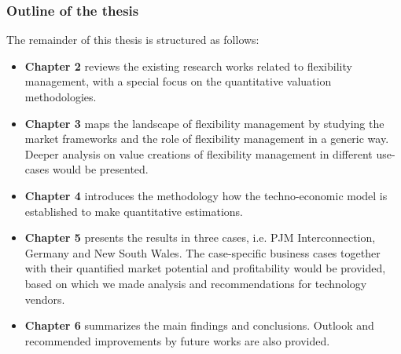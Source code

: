 \subsubsection{Outline of the thesis}

The remainder of this thesis is structured as follows: 

\begin{itemize}
	\item \textbf{Chapter 2} reviews the existing research works related to flexibility management, with a special focus on the quantitative valuation methodologies.
	\item \textbf{Chapter 3} maps the landscape of flexibility management by studying the market frameworks and the role of flexibility management in a generic way. Deeper analysis on value creations of flexibility management in different use-cases would be presented.
	\item \textbf{Chapter 4} introduces the methodology how the techno-economic model is established to make quantitative estimations.
	\item \textbf{Chapter 5} presents the results in three cases, i.e. PJM Interconnection, Germany and New South Wales. The case-specific business cases together with their quantified market potential and profitability would be provided, based on which we made analysis and recommendations for technology vendors.
	\item \textbf{Chapter 6} summarizes the main findings and conclusions. Outlook and recommended improvements by future works are also provided.
\end{itemize}
